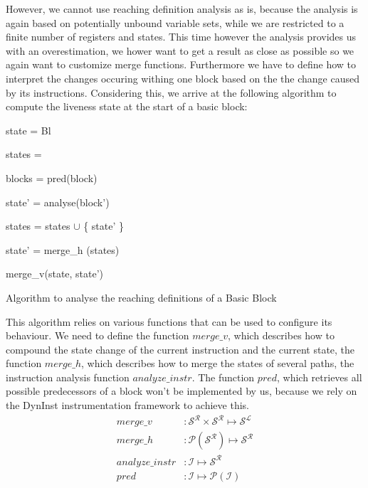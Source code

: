However, we cannot use reaching definition analysis as is, because the analysis is again based on potentially unbound variable sets, while we are restricted to a finite number of registers and states. This time however the analysis provides us with an overestimation, we hower want to get a result as close as possible so we again want to customize merge functions. Furthermore we have to define how to interpret the changes occuring withing one block based on the the change caused by its instructions. Considering this, we arrive at the following algorithm to compute the liveness state at the start of a basic block:

{
\centering
\begin{algorithm}[H]
	\SetAlgoLined
	{
 	state = Bl
 	

	states = {}
	
	blocks = pred(block)
	
	 {
	
 		state' = analyse(block')
 		
		states = states $\cup$ \{ state' \}
	}

	state' = merge\_h (states)

	\Return merge\_v(state, state')

	}
\caption{Algorithm to analyse the reaching definitions of a Basic Block}
\label{alg:reaching}
\end{algorithm}
}

This algorithm relies on various functions that can be used to configure its behaviour. We need to define the function $merge\_v$, which describes how to compound the state change of the current instruction and the current state, the function $merge\_h$, which describes how to merge the states of several paths, the instruction analysis function $analyze\_instr$. The function $pred$, which retrieves all possible predecessors of a block won't be implemented by us, because we rely on the DynInst instrumentation framework to achieve this.
\begin{subequations}
\label{eq:livenesscustom}
\begin{align}
merge\_v &: \mathcal{S}^\mathcal{R} \times \mathcal{S}^\mathcal{R} \mapsto \mathcal{S}^\mathcal{L}\\
merge\_h &: \mathcal{P}(\mathcal{S}^\mathcal{R}) \mapsto \mathcal{S}^\mathcal{R}\\
analyze\_instr &: \mathcal {I} \mapsto \mathcal{S}^\mathcal{R} \\
pred &: \mathcal{I} \mapsto \mathcal{P}(\mathcal{I})
\end{align}
\end{subequations}

